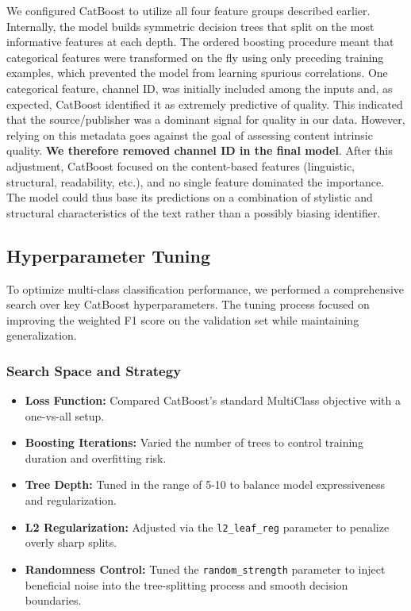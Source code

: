 We configured \ac{CatBoost} to utilize all four feature groups described earlier. Internally, the model builds symmetric decision trees that split on the most informative features at each depth. The ordered boosting procedure meant that categorical features were transformed on the fly using only preceding training examples, which prevented the model from learning spurious correlations. One categorical feature, channel ID, was initially included among the inputs and, as expected, \ac{CatBoost} identified it as extremely predictive of quality. This indicated that the source/publisher was a dominant signal for quality in our data. However, relying on this metadata goes against the goal of assessing content intrinsic quality. \textbf{We therefore removed channel ID in the final model}. After this adjustment, \ac{CatBoost} focused on the content-based features (linguistic, structural, readability, etc.), and no single feature dominated the importance. The model could thus base its predictions on a combination of stylistic and structural characteristics of the text rather than a possibly biasing identifier.

\subsection{Hyperparameter Tuning}

To optimize multi-class classification performance, we performed a comprehensive search over key \ac{CatBoost} hyperparameters. The tuning process focused on improving the weighted F1 score on the validation set while maintaining generalization.

\subsubsection*{Search Space and Strategy}
\begin{itemize}[leftmargin=1.5em]
    \item \textbf{Loss Function:} Compared \ac{CatBoost}'s standard MultiClass objective with a one-vs-all setup.
    \item \textbf{Boosting Iterations:} Varied the number of trees to control training duration and overfitting risk.
    \item \textbf{Tree Depth:} Tuned in the range of 5-10 to balance model expressiveness and regularization.
    \item \textbf{L2 Regularization:} Adjusted via the \texttt{l2\_leaf\_reg} parameter to penalize overly sharp splits.
    \item \textbf{Randomness Control:} Tuned the \texttt{random\_strength} parameter to inject beneficial noise into the tree-splitting process and smooth decision boundaries.
\end{itemize}


